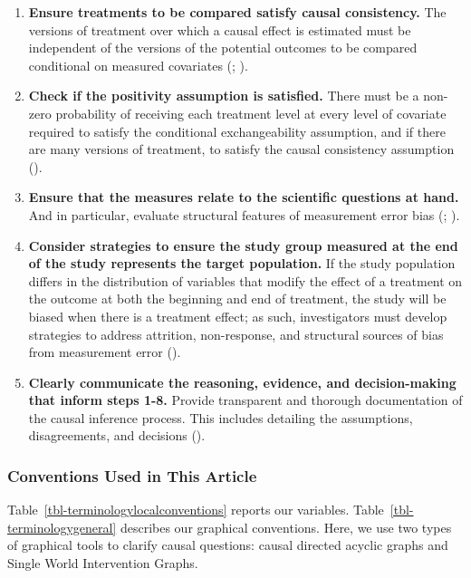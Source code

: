 \documentclass[
  single column]{article}
\begin{document}
\begin{enumerate}
  ).
\item
  \textbf{Ensure treatments to be compared satisfy causal consistency.}
  The versions of treatment over which a causal effect is estimated must
  be independent of the versions of the potential outcomes to be
  compared conditional on measured covariates
  (;
  ).
\item
  \textbf{Check if the positivity assumption is satisfied.} There must
  be a non-zero probability of receiving each treatment level at every
  level of covariate required to satisfy the conditional exchangeability
  assumption, and if there are many versions of treatment, to satisfy
  the causal consistency assumption
  ().
\item
  \textbf{Ensure that the measures relate to the scientific questions at
  hand.} And in particular, evaluate structural features of measurement
  error bias (;
  ).
\item
  \textbf{Consider strategies to ensure the study group measured at the
  end of the study represents the target population.} If the study
  population differs in the distribution of variables that modify the
  effect of a treatment on the outcome at both the beginning and end of
  treatment, the study will be biased when there is a treatment effect;
  as such, investigators must develop strategies to address attrition,
  non-response, and structural sources of bias from measurement error
  ().
\item
  \textbf{Clearly communicate the reasoning, evidence, and
  decision-making that inform steps 1-8.} Provide transparent and
  thorough documentation of the causal inference process. This includes
  detailing the assumptions, disagreements, and decisions
  ().
\end{enumerate}

\subsubsection{Conventions Used in This
Article}\label{conventions-used-in-this-article}

Table~\ref{tbl-terminologylocalconventions} reports our variables.
Table~\ref{tbl-terminologygeneral} describes our graphical conventions.
Here, we use two types of graphical tools to clarify causal questions:
causal directed acyclic graphs and Single World Intervention Graphs.
\end{document}
